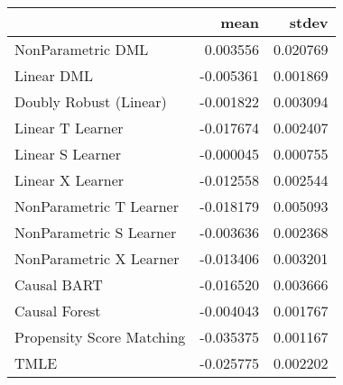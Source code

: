 \begin{tabular}{lrr}
\toprule
{} &      mean &     stdev \\
\midrule
NonParametric DML         &  0.003556 &  0.020769 \\
Linear DML                & -0.005361 &  0.001869 \\
Doubly Robust (Linear)    & -0.001822 &  0.003094 \\
Linear T Learner          & -0.017674 &  0.002407 \\
Linear S Learner          & -0.000045 &  0.000755 \\
Linear X Learner          & -0.012558 &  0.002544 \\
NonParametric T Learner   & -0.018179 &  0.005093 \\
NonParametric S Learner   & -0.003636 &  0.002368 \\
NonParametric X Learner   & -0.013406 &  0.003201 \\
Causal BART               & -0.016520 &  0.003666 \\
Causal Forest             & -0.004043 &  0.001767 \\
Propensity Score Matching & -0.035375 &  0.001167 \\
TMLE                      & -0.025775 &  0.002202 \\
\bottomrule
\end{tabular}

